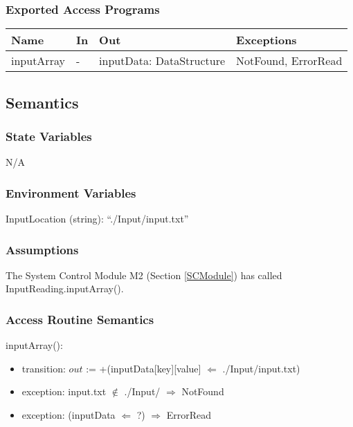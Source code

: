 \documentclass[12pt, titlepage]{article}
\begin{document}
\subsubsection{Exported Access Programs}

\begin{center}
	\begin{tabular}{p{2cm} p{4cm} p{3cm} p{2cm}}
		\hline
		\textbf{Name} & \textbf{In} & \textbf{Out} & \textbf{Exceptions} \\
		\hline
		inputArray & - & inputData: DataStructure & NotFound, ErrorRead \\
		\hline
	\end{tabular}
\end{center}

\subsection{Semantics}

\subsubsection{State Variables}
N/A

\subsubsection{Environment Variables}

InputLocation (string): ``./Input/input.txt''

\subsubsection{Assumptions}

The System Control Module M2 (Section \ref{SCModule}) has called InputReading.inputArray().

\subsubsection{Access Routine Semantics}

\noindent inputArray():
\begin{itemize}
	\item transition: $out$ := +(inputData[key][value] $\Leftarrow$ ./Input/input.txt)
	\item exception: input.txt $\notin$ ./Input/ $\Rightarrow$ NotFound
	\item exception: (inputData $\Leftarrow$ ?) $\Rightarrow$ ErrorRead
\end{itemize}
\end{document}
